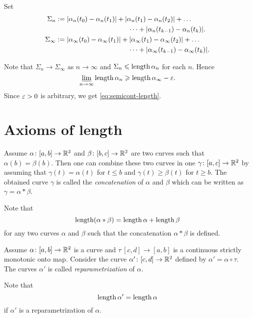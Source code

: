 Set 
\begin{align*}\Sigma_n
&\df
|\alpha_n(t_0)-\alpha_n(t_1)|+|\alpha_n(t_1)-\alpha_n(t_2)|+\dots
\\
&\ \ \ \ \ \ \ \ \ \ \ \ \ \ \ \ \ \ \ \ \ \ \ \ \ \ \ \ \ \ \ \ \dots+|\alpha_n(t_{k-1})-\alpha_n(t_k)|.
\\
\Sigma_\infty
&\df
|\alpha_\infty(t_0)-\alpha_\infty(t_1)|+|\alpha_\infty(t_1)-\alpha_\infty(t_2)|+\dots
\\
&\ \ \ \ \ \ \ \ \ \ \ \ \ \ \ \ \ \ \ \ \ \ \ \ \ \ \ \ \ \ \ \ \dots+|\alpha_\infty(t_{k-1})-\alpha_\infty(t_k)|.
\end{align*}

Note that $\Sigma_n\to \Sigma_\infty$ as $n\to\infty$
and $\Sigma_n\leqslant\mathop{\rm length}\nolimits\alpha_n$ for each $n$.
Hence
$$\varliminf_{n\to\infty} \mathop{\rm length}\nolimits\alpha_n \geqslant \mathop{\rm length}\nolimits\alpha_\infty-\varepsilon.$$
Since $\varepsilon>0$ is arbitrary, we get \ref{eq:semicont-length}.\qeds

\section{Axioms of length}

Assume $\alpha\colon[a,b]\to \mathbb{R}^2$ and $\beta\:[b,c]\z\to \RR^2$ are two curves such that $\alpha(b)=\beta(b)$.
Then one can combine these two curves in one $\gamma\:[a,c]\z\to \RR^2$ by assuming that $\gamma(t)=\alpha(t)$ for $t\le b$ and $\gamma(t)\ge\beta(t)$ for $t\ge b$.
The obtained curve $\gamma$ is called the 
\emph{concatenation} of $\alpha$ and $\beta$ which can be written as $\gamma=\alpha*\beta$.

Note that
\[\mathop{\rm length}\nolimits(\alpha*\beta)=\mathop{\rm length}\nolimits\alpha+\mathop{\rm length}\nolimits\beta\]
for any two curves $\alpha$ and $\beta$ such that the concatenation $\alpha*\beta$ is defined.

Assume $\alpha\colon[a,b]\to \mathbb{R}^2$ is a curve and $\tau\:[c,d]\to [a,b]$ is a continuous strictly monotonic onto map.
Consider the curve $\alpha'\colon[c,d]\to \mathbb{R}^2$ defined by $\alpha'=\alpha\circ\tau$.
The curves $\alpha'$ is called \emph{reparametrization} of $\alpha$.

Note that 
\[\mathop{\rm length}\nolimits\alpha'=\mathop{\rm length}\nolimits\alpha\]
if $\alpha'$ is a reparametrization of $\alpha$.





